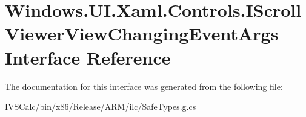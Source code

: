 \hypertarget{interface_windows_1_1_u_i_1_1_xaml_1_1_controls_1_1_i_scroll_viewer_view_changing_event_args}{}\section{Windows.\+U\+I.\+Xaml.\+Controls.\+I\+Scroll\+Viewer\+View\+Changing\+Event\+Args Interface Reference}
\label{interface_windows_1_1_u_i_1_1_xaml_1_1_controls_1_1_i_scroll_viewer_view_changing_event_args}


The documentation for this interface was generated from the following file\+:\begin{DoxyCompactItemize}
\item 
I\+V\+S\+Calc/bin/x86/\+Release/\+A\+R\+M/ilc/Safe\+Types.\+g.\+cs\end{DoxyCompactItemize}
